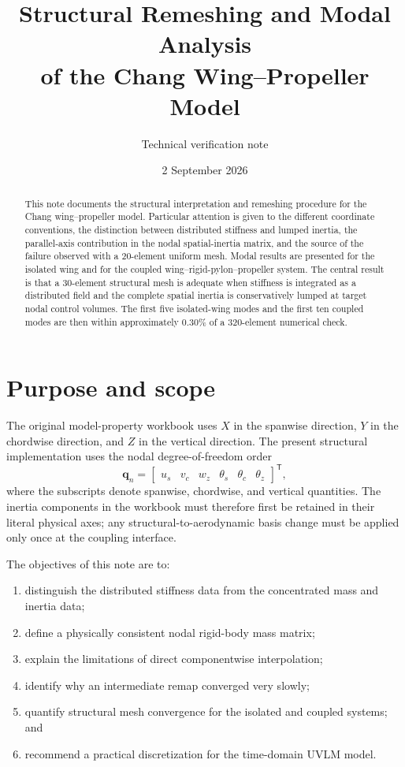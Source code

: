 \documentclass[11pt,a4paper]{article}
\title{Structural Remeshing and Modal Analysis\\
of the Chang Wing--Propeller Model}
\author{Technical verification note}
\date{2 September 2026}
\newcommand{\vect}[1]{\bm{#1}}
\begin{document}
\maketitle

\begin{abstract}
This note documents the structural interpretation and remeshing procedure for
the Chang wing--propeller model.  Particular attention is given to the
different coordinate conventions, the distinction between distributed
stiffness and lumped inertia, the parallel-axis contribution in the nodal
spatial-inertia matrix, and the source of the failure observed with a
20-element uniform mesh.  Modal results are presented for the isolated wing
and for the coupled wing--rigid-pylon--propeller system.  The central result is
that a 30-element structural mesh is adequate when stiffness is integrated as
a distributed field and the complete spatial inertia is conservatively
lumped at target nodal control volumes.  The first five isolated-wing modes
and the first ten coupled modes are then within approximately \(0.30\%\) of a
320-element numerical check.
\end{abstract}

\tableofcontents
\newpage

\section{Purpose and scope}

The original model-property workbook uses \(X\) in the spanwise direction,
\(Y\) in the chordwise direction, and \(Z\) in the vertical direction.  The
present structural implementation uses the nodal degree-of-freedom order
\begin{equation}
\vect{q}_n =
\begin{bmatrix}
u_s & v_c & w_z & \theta_s & \theta_c & \theta_z
\end{bmatrix}^{\mathsf T},
\end{equation}
where the subscripts denote spanwise, chordwise, and vertical quantities.
The inertia components in the workbook must therefore first be retained in
their literal physical axes; any structural-to-aerodynamic basis change must
be applied only once at the coupling interface.

The objectives of this note are to:
\begin{enumerate}
  \item distinguish the distributed stiffness data from the concentrated
        mass and inertia data;
  \item define a physically consistent nodal rigid-body mass matrix;
  \item explain the limitations of direct componentwise interpolation;
  \item identify why an intermediate remap converged very slowly;
  \item quantify structural mesh convergence for the isolated and coupled
        systems; and
  \item recommend a practical discretization for the time-domain UVLM model.
\end{enumerate}
\end{document}
